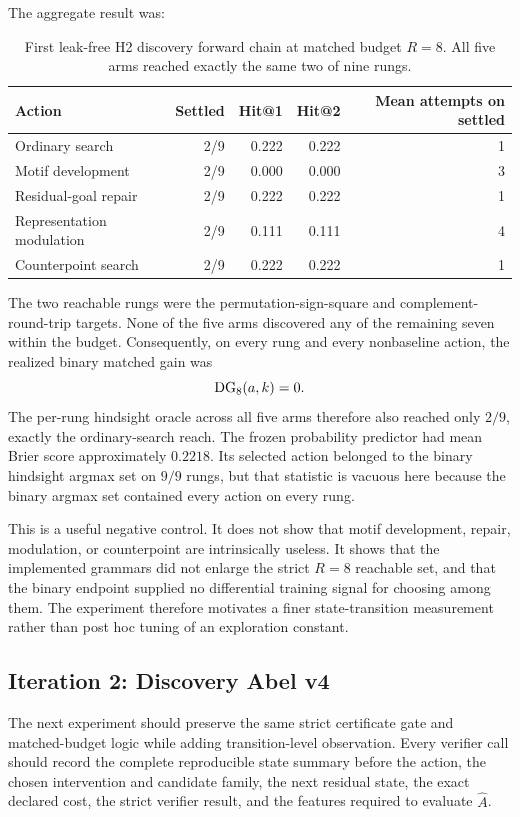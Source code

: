 The aggregate result was:
\begin{table}[ht]
\centering
\small
\begin{tabular}{lrrrr}
\toprule
Action & Settled & Hit@1 & Hit@2 & Mean attempts on settled\\
\midrule
Ordinary search & 2/9 & 0.222 & 0.222 & 1\\
Motif development & 2/9 & 0.000 & 0.000 & 3\\
Residual-goal repair & 2/9 & 0.222 & 0.222 & 1\\
Representation modulation & 2/9 & 0.111 & 0.111 & 4\\
Counterpoint search & 2/9 & 0.222 & 0.222 & 1\\
\bottomrule
\end{tabular}
\caption{First leak-free H2 discovery forward chain at matched budget $R=8$. All five arms reached exactly the same two of nine rungs.}
\end{table}

The two reachable rungs were the permutation-sign-square and complement-round-trip targets. None of the five arms discovered any of the remaining seven within the budget. Consequently, on every rung and every nonbaseline action, the realized binary matched gain was
\[
\operatorname{DG}_8(a,k)=0.
\]
The per-rung hindsight oracle across all five arms therefore also reached only $2/9$, exactly the ordinary-search reach. The frozen probability predictor had mean Brier score approximately $0.2218$. Its selected action belonged to the binary hindsight argmax set on $9/9$ rungs, but that statistic is vacuous here because the binary argmax set contained every action on every rung.

This is a useful negative control. It does not show that motif development, repair, modulation, or counterpoint are intrinsically useless. It shows that the implemented grammars did not enlarge the strict $R=8$ reachable set, and that the binary endpoint supplied no differential training signal for choosing among them. The experiment therefore motivates a finer state-transition measurement rather than post hoc tuning of an exploration constant.

\subsection{Iteration 2: Discovery Abel v4}
The next experiment should preserve the same strict certificate gate and matched-budget logic while adding transition-level observation. Every verifier call should record the complete reproducible state summary before the action, the chosen intervention and candidate family, the next residual state, the exact declared cost, the strict verifier result, and the features required to evaluate $\widehat A$.

